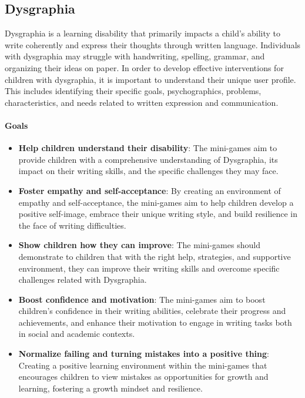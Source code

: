 \subsection{Dysgraphia}
Dysgraphia is a learning disability that primarily impacts a child's ability to write coherently and express their thoughts through written language. Individuals with dysgraphia may struggle with handwriting, spelling, grammar, and organizing their ideas on paper. In order to develop effective interventions for children with dysgraphia, it is important to understand their unique user profile. This includes identifying their specific goals, psychographics, problems, characteristics, and needs related to written expression and communication.

\paragraph{Goals}
\begin{itemize}
    \item \textbf{Help children understand their disability}: The mini-games aim to provide children with a comprehensive understanding of Dysgraphia, its impact on their writing skills, and the specific challenges they may face.
    \item \textbf{Foster empathy and self-acceptance}: By creating an environment of empathy and self-acceptance, the mini-games aim to help children develop a positive self-image, embrace their unique writing style, and build resilience in the face of writing difficulties.
    \item \textbf{Show children how they can improve}: The mini-games should demonstrate to children that with the right help, strategies, and supportive environment, they can improve their writing skills and overcome specific challenges related with Dysgraphia.
    \item \textbf{Boost confidence and motivation}: The mini-games aim to boost children's confidence in their writing abilities, celebrate their progress and achievements, and enhance their motivation to engage in writing tasks both in social and academic contexts.
    \item \textbf{Normalize failing and turning mistakes into a positive thing}: Creating a positive learning environment within the mini-games that encourages children to view mistakes as opportunities for growth and learning, fostering a growth mindset and resilience.
\end{itemize}

